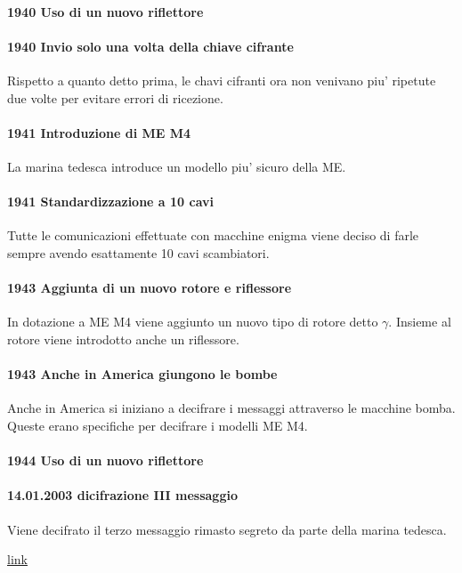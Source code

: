 \paragraph{1940 Uso di un nuovo riflettore}

\paragraph{1940 Invio solo una volta della chiave cifrante}
Rispetto a quanto detto prima, le chavi cifranti ora non venivano piu'
ripetute due volte per evitare errori di ricezione.

\paragraph{1941 Introduzione di ME M4}
La marina tedesca introduce un modello piu' sicuro della ME.

\paragraph{1941 Standardizzazione a 10 cavi}
Tutte le comunicazioni effettuate con macchine enigma viene deciso
di farle sempre avendo esattamente 10 cavi scambiatori.

\paragraph{1943 Aggiunta di un nuovo rotore e riflessore}
In dotazione a ME M4 viene aggiunto un nuovo tipo di rotore detto $\gamma$.
Insieme al rotore viene introdotto anche un riflessore.

\paragraph{1943 Anche in America giungono le bombe}
Anche in America si iniziano a decifrare i messaggi attraverso
le macchine bomba.
Queste erano specifiche per decifrare i modelli ME M4.

\paragraph{1944 Uso di un nuovo riflettore}

\paragraph{14.01.2003 dicifrazione III messaggio}
Viene decifrato il terzo messaggio rimasto segreto da parte
della marina tedesca.

\href{https://www.enigma.hoerenberg.com/index.php?cat=M4\%20Project\%202006}{link}
